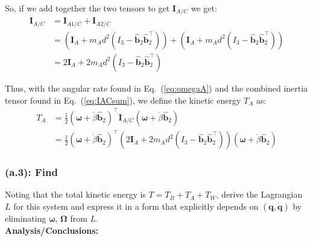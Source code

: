\documentclass[titlepage]{article}
\begin{document}
  So, if we add together the two tensors to get $\boldsymbol{I}_{A/C}$ we get:
\begin{equation}
	\begin{split}
		\boldsymbol{I}_{A/C}&=\boldsymbol{I}_{A1/C}+\boldsymbol{I}_{A2/C} \\
		&=\left(\boldsymbol{I}_A+m_Ad^2\left(I_3-\hat{\boldsymbol{b}}_2\hat{\boldsymbol{b}}_2^\top\right)\right)+\left(\boldsymbol{I}_A+m_Ad^2\left(I_3-\hat{\boldsymbol{b}}_2\hat{\boldsymbol{b}}_2^\top\right)\right) \\
		&=2\boldsymbol{I}_A+2m_Ad^2\left(I_3-\hat{\boldsymbol{b}}_2\hat{\boldsymbol{b}}_2^\top\right)
	\end{split}
	\label{eq:IACsum}
\end{equation}

\begin{mdframed}[linewidth=1pt, innertopmargin=10pt, innerbottommargin=10pt]
	Thus, with the angular rate found in Eq.~(\ref{eq:omegaA}) and the combined inertia tensor found in Eq.~(\ref{eq:IACsum}), we define the kinetic energy $T_A$ as:
	\begin{equation}
		\begin{split}
			T_A&=\frac{1}{2}\left(\boldsymbol{\omega}+\dot{\beta}\hat{\boldsymbol{b}}_2\right)^\top\boldsymbol{I}_{A/C}\left(\boldsymbol{\omega}+\dot{\beta}\hat{\boldsymbol{b}}_2\right) \\
			&=\frac{1}{2}\left(\boldsymbol{\omega}+\dot{\beta}\hat{\boldsymbol{b}}_2\right)^\top\left(2\boldsymbol{I}_A+2m_Ad^2\left(I_3-\hat{\boldsymbol{b}}_2\hat{\boldsymbol{b}}_2^\top\right)\right)\left(\boldsymbol{\omega}+\dot{\beta}\hat{\boldsymbol{b}}_2\right)
		\end{split}
	\end{equation}
\end{mdframed}

\subsubsection*{(a.3): Find}

Noting that the total kinetic energy is $T=T_B+T_A+T_W$, derive the Lagrangian $L$ for this system and express it in a form that explicitly depends on $(\boldsymbol{q},\dot{\boldsymbol{q}})$ by eliminating $\boldsymbol{\omega}$, $\boldsymbol{\Omega}$ from $L$.\\

\textbf{Analysis/Conclusions:}\\
\end{document}
